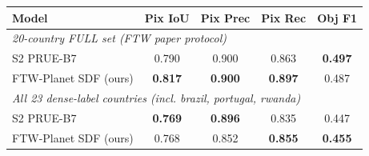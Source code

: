 \begin{tabular}{lcccc}
\toprule
Model & Pix IoU & Pix Prec & Pix Rec & Obj F1 \\
\midrule
\multicolumn{5}{l}{\textit{20-country FULL set (FTW paper protocol)}}\\
S2 PRUE-B7 \cite{kerner2024ftw}     & 0.790 & 0.900 & 0.863 & \textbf{0.497} \\
FTW-Planet SDF (ours)               & \textbf{0.817} & \textbf{0.900} & \textbf{0.897} & 0.487 \\
\midrule
\multicolumn{5}{l}{\textit{All 23 dense-label countries (incl. brazil, portugal, rwanda)}}\\
S2 PRUE-B7 \cite{kerner2024ftw}     & \textbf{0.769} & \textbf{0.896} & 0.835 & 0.447 \\
FTW-Planet SDF (ours)               & 0.768 & 0.852 & \textbf{0.855} & \textbf{0.455} \\
\bottomrule
\end{tabular}
